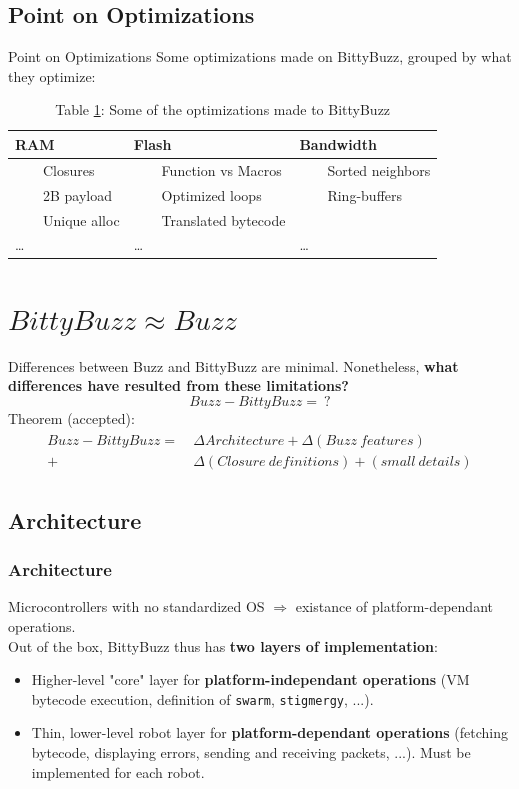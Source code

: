 \documentclass{beamer}
\newcommand{\tabitem}{~~\llap{\color{darkorange}\textbullet}~~}
\begin{document}
	\subsection{Point on Optimizations}
	\begin{frame}{Point on Optimizations}
		Some optimizations made on BittyBuzz, grouped by what they optimize:
		\begin{table}
			\begin{tabular}{l|l|l}
				RAM & Flash & Bandwidth\\
				\hline
				\tabitem Closures & \tabitem Function vs Macros & \tabitem Sorted neighbors\\
				\tabitem 2B payload & \tabitem Optimized loops & \tabitem Ring-buffers\\
				\tabitem Unique alloc & \tabitem Translated bytecode &\\
				\dots & \dots & \dots
			\end{tabular}
			\caption{
				\label{table:Optimizations}Table \ref{table:Optimizations}: Some of the optimizations made to BittyBuzz}
		\end{table}
	\end{frame}
	\section{$BittyBuzz \approx Buzz$}
	\begin{frame}
		Differences between Buzz and BittyBuzz are minimal. Nonetheless, \textbf{what differences have resulted from these limitations?}\\
		\[Buzz - BittyBuzz =~?\]
		Theorem (accepted):
		\begin{align}
		\begin{split}
		Buzz - BittyBuzz = ~&\Delta Architecture + \Delta (Buzz~features)\\
		+ &\Delta (Closure~definitions) + (small~details)
		\end{split}
		\end{align}
	\end{frame}
	\subsection{Architecture}
	\begin{frame}
		\frametitle{Architecture}
		Microcontrollers with no standardized OS $\Rightarrow$ existance of platform-dependant operations.\\
		Out of the box, BittyBuzz thus has \textbf{two layers of implementation}:
		\begin{itemize}
			\item Higher-level "core" layer for \textbf{platform-independant operations} (VM bytecode execution, definition of \texttt{swarm}, \texttt{stigmergy}, ...).
			\item Thin, lower-level robot layer for \textbf{platform-dependant operations} (fetching bytecode, displaying errors, sending and receiving packets, ...). Must be implemented for each robot.
		\end{itemize}
	\end{frame}
\end{document}

